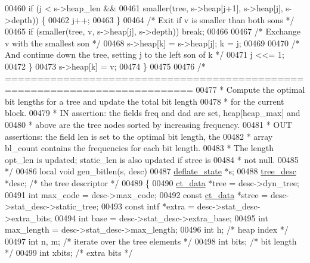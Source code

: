 \begin{DoxyCode}
{{{{{{{{{00460         \textcolor{keywordflow}{if} (j < s->heap\_len &&
00461             smaller(tree, s->heap[j+1], s->heap[j], s->depth)) \{
00462             j++;
00463         \}
00464         \textcolor{comment}{/* Exit if v is smaller than both sons */}
00465         \textcolor{keywordflow}{if} (smaller(tree, v, s->heap[j], s->depth)) \textcolor{keywordflow}{break};
00466 
00467         \textcolor{comment}{/* Exchange v with the smallest son */}
00468         s->heap[k] = s->heap[j];  k = j;
00469 
00470         \textcolor{comment}{/* And continue down the tree, setting j to the left son of k */}
00471         j <<= 1;
00472     \}
00473     s->heap[k] = v;
00474 \}
00475 
00476 \textcolor{comment}{/* ===========================================================================}
00477 \textcolor{comment}{ * Compute the optimal bit lengths for a tree and update the total bit length}
00478 \textcolor{comment}{ * for the current block.}
00479 \textcolor{comment}{ * IN assertion: the fields freq and dad are set, heap[heap\_max] and}
00480 \textcolor{comment}{ *    above are the tree nodes sorted by increasing frequency.}
00481 \textcolor{comment}{ * OUT assertions: the field len is set to the optimal bit length, the}
00482 \textcolor{comment}{ *     array bl\_count contains the frequencies for each bit length.}
00483 \textcolor{comment}{ *     The length opt\_len is updated; static\_len is also updated if stree is}
00484 \textcolor{comment}{ *     not null.}
00485 \textcolor{comment}{ */}
00486 local \textcolor{keywordtype}{void} gen\_bitlen(s, desc)
00487     \hyperlink{structinternal__state}{deflate\_state} *s;
00488     \hyperlink{structtree__desc__s}{tree\_desc} *desc;    \textcolor{comment}{/* the tree descriptor */}
00489 \{
00490     \hyperlink{structct__data__s}{ct\_data} *tree        = desc->dyn\_tree;
00491     \textcolor{keywordtype}{int} max\_code         = desc->max\_code;
00492     \textcolor{keyword}{const} \hyperlink{structct__data__s}{ct\_data} *stree = desc->stat\_desc->static\_tree;
00493     \textcolor{keyword}{const} intf *extra    = desc->stat\_desc->extra\_bits;
00494     \textcolor{keywordtype}{int} base             = desc->stat\_desc->extra\_base;
00495     \textcolor{keywordtype}{int} max\_length       = desc->stat\_desc->max\_length;
00496     \textcolor{keywordtype}{int} h;              \textcolor{comment}{/* heap index */}
00497     \textcolor{keywordtype}{int} n, m;           \textcolor{comment}{/* iterate over the tree elements */}
00498     \textcolor{keywordtype}{int} bits;           \textcolor{comment}{/* bit length */}
00499     \textcolor{keywordtype}{int} xbits;          \textcolor{comment}{/* extra bits */}
}}}}}}}}}
\end{DoxyCode}
